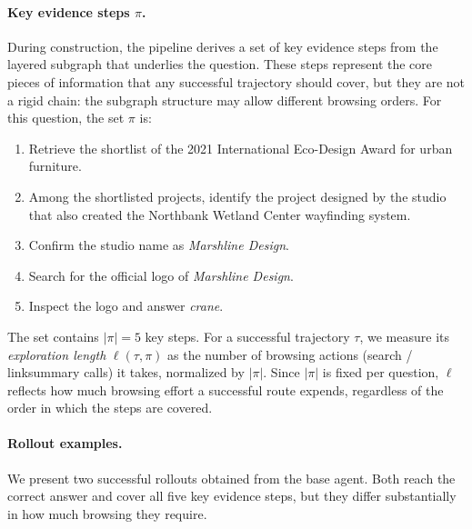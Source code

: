 \paragraph{Key evidence steps $\pi$.}
During construction, the pipeline derives a set of key evidence steps from the layered subgraph that underlies the question. These steps represent the core pieces of information that any successful trajectory should cover, but they are not a rigid chain: the subgraph structure may allow different browsing orders. For this question, the set $\pi$ is:
\begin{enumerate}[leftmargin=*,nosep]
    \item[$\rho_1$] Retrieve the shortlist of the 2021 International Eco-Design Award for urban furniture.
    \item[$\rho_2$] Among the shortlisted projects, identify the project designed by the studio that also created the Northbank Wetland Center wayfinding system.
    \item[$\rho_3$] Confirm the studio name as \textit{Marshline Design}.
    \item[$\rho_4$] Search for the official logo of \textit{Marshline Design}.
    \item[$\rho_5$] Inspect the logo and answer \textit{crane}.
\end{enumerate}
The set contains $|\pi|=5$ key steps. For a successful trajectory $\tau$, we measure its \emph{exploration length} $\ell(\tau,\pi)$ as the number of browsing actions (search / linksummary calls) it takes, normalized by $|\pi|$. Since $|\pi|$ is fixed per question, $\ell$ reflects how much browsing effort a successful route expends, regardless of the order in which the steps are covered.

\paragraph{Rollout examples.}
We present two successful rollouts obtained from the base agent. Both reach the correct answer and cover all five key evidence steps, but they differ substantially in how much browsing they require.

